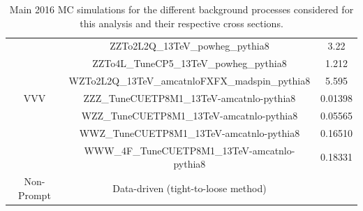 \documentclass[a4paper, 10pt, openright]{report}
\begin{document}
\begin{appendices}
\begin{table}
\begin{center}
{\begin{tabular}{ c|c|c }
& ZZTo2L2Q\_13TeV\_powheg\_pythia8 & 3.22 \\
& ZZTo4L\_TuneCP5\_13TeV\_powheg\_pythia8 & 1.212 \\
& WZTo2L2Q\_13TeV\_amcatnloFXFX\_madspin\_pythia8 & 5.595 \\
 \hline
 VVV & ZZZ\_TuneCUETP8M1\_13TeV-amcatnlo-pythia8 & 0.01398 \\
 & WZZ\_TuneCUETP8M1\_13TeV-amcatnlo-pythia8 & 0.05565 \\
 & WWZ\_TuneCUETP8M1\_13TeV-amcatnlo-pythia8 & 0.16510 \\
 & WWW\_4F\_TuneCUETP8M1\_13TeV-amcatnlo-pythia8 & 0.18331 \\
 \hline
 Non-Prompt & Data-driven (tight-to-loose method) & \\
 \hline
\end{tabular}
}
\caption{Main 2016 \ac{MC} simulations for the different background processes considered for this analysis and their respective cross sections.}
\label{table:MC2016}
\end{center}
\end{table}


\end{appendices}
\end{document}
